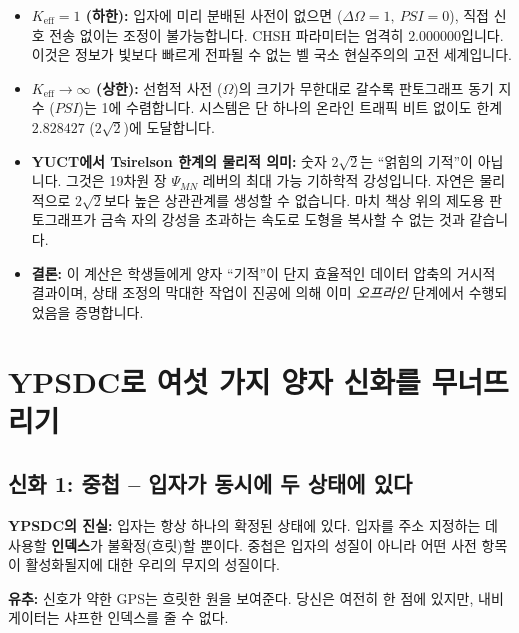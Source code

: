 \documentclass[12pt,a4paper]{article}
\begin{document}
	\begin{itemize}
		\item \textbf{\(K_{\mathrm{eff}} = 1\) (하한):}  
		입자에 미리 분배된 사전이 없으면 (\(\Delta\Omega = 1,\ PSI = 0\)), 직접 신호 전송 없이는 조정이 불가능합니다. CHSH 파라미터는 엄격히 \(2.000000\)입니다. 이것은 정보가 빛보다 빠르게 전파될 수 없는 벨 국소 현실주의의 고전 세계입니다.
		
		\item \textbf{\(K_{\mathrm{eff}} \to \infty\) (상한):}  
		선험적 사전 (\(\Omega\))의 크기가 무한대로 갈수록 판토그래프 동기 지수 (\(PSI\))는 1에 수렴합니다. 시스템은 단 하나의 온라인 트래픽 비트 없이도 한계 \(2.828427\) (\(2\sqrt{2}\))에 도달합니다.
		
		\item \textbf{YUCT에서 Tsirelson 한계의 물리적 의미:}  
		숫자 \(2\sqrt{2}\)는 “얽힘의 기적”이 아닙니다. 그것은 19차원 장 \(\Psi_{MN}\) 레버의 최대 가능 기하학적 강성입니다. 자연은 물리적으로 \(2\sqrt{2}\)보다 높은 상관관계를 생성할 수 없습니다. 마치 책상 위의 제도용 판토그래프가 금속 자의 강성을 초과하는 속도로 도형을 복사할 수 없는 것과 같습니다.
		
		\item \textbf{결론:}  
		이 계산은 학생들에게 양자 “기적”이 단지 효율적인 데이터 압축의 거시적 결과이며, 상태 조정의 막대한 작업이 진공에 의해 이미 \textit{오프라인} 단계에서 수행되었음을 증명합니다.
	\end{itemize}
	
	
	\section{YPSDC로 여섯 가지 양자 신화를 무너뜨리기}
	
	\subsection{신화 1: 중첩 – 입자가 동시에 두 상태에 있다}
	\textbf{YPSDC의 진실:} 입자는 항상 하나의 확정된 상태에 있다. 입자를 주소 지정하는 데 사용할 \textbf{인덱스}가 불확정(흐릿)할 뿐이다. 중첩은 입자의 성질이 아니라 어떤 사전 항목이 활성화될지에 대한 우리의 무지의 성질이다.
	\par
	\textbf{유추:} 신호가 약한 GPS는 흐릿한 원을 보여준다. 당신은 여전히 한 점에 있지만, 내비게이터는 샤프한 인덱스를 줄 수 없다.
	
\end{document}
